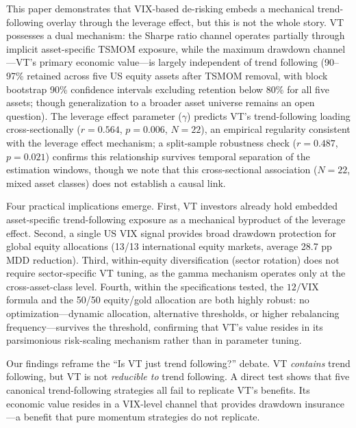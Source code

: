This paper demonstrates that VIX-based de-risking embeds a mechanical trend-following overlay through the leverage effect, but this is not the whole story. VT possesses a dual mechanism: the Sharpe ratio channel operates partially through implicit asset-specific TSMOM exposure, while the maximum drawdown channel---VT's primary economic value---is largely independent of trend following (90--97\% retained across five US equity assets after TSMOM removal, with block bootstrap 90\% confidence intervals excluding retention below 80\% for all five assets; though generalization to a broader asset universe remains an open question). The leverage effect parameter ($\gamma$) predicts VT's trend-following loading cross-sectionally ($r = 0.564$, $p = 0.006$, $N = 22$), an empirical regularity consistent with the leverage effect mechanism; a split-sample robustness check ($r = 0.487$, $p = 0.021$) confirms this relationship survives temporal separation of the estimation windows, though we note that this cross-sectional association ($N = 22$, mixed asset classes) does not establish a causal link.

Four practical implications emerge. First, VT investors already hold embedded asset-specific trend-following exposure as a mechanical byproduct of the leverage effect. Second, a single US VIX signal provides broad drawdown protection for global equity allocations (13/13 international equity markets, average 28.7 pp MDD reduction). Third, within-equity diversification (sector rotation) does not require sector-specific VT tuning, as the gamma mechanism operates only at the cross-asset-class level. Fourth, within the specifications tested, the $12/\text{VIX}$ formula and the 50/50 equity/gold allocation are both highly robust: no optimization---dynamic allocation, alternative thresholds, or higher rebalancing frequency---survives the \citet{harvey2016} threshold, confirming that VT's value resides in its parsimonious risk-scaling mechanism rather than in parameter tuning.

Our findings reframe the ``Is VT just trend following?'' debate. VT \textit{contains} trend following, but VT is not \textit{reducible to} trend following. A direct test shows that five canonical trend-following strategies all fail to replicate VT's benefits. Its economic value resides in a VIX-level channel that provides drawdown insurance---a benefit that pure momentum strategies do not replicate.


